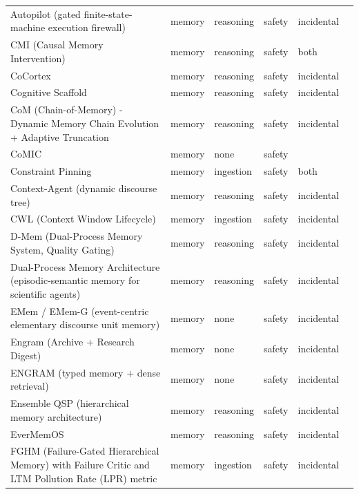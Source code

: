 \begin{longtable}{@{}>{\raggedright\arraybackslash}p{}lllll@{}}
Autopilot (gated finite-state-machine execution firewall) & memory & reasoning & safety & incidental & \cite{deng-2026-goalautopilot} \\
CMI (Causal Memory Intervention) & memory & reasoning & safety & both & \cite{srivastava-2026-causal} \\
CoCortex & memory & reasoning & safety & incidental & \cite{kaviyaraj-2026-cocortex} \\
Cognitive Scaffold & memory & reasoning & safety & incidental & \cite{ai-2026-cognitive} \\
CoM (Chain-of-Memory) - Dynamic Memory Chain Evolution + Adaptive Truncation & memory & reasoning & safety & incidental & \cite{xu-2026-chainofmemory} \\
CoMIC & memory & none & safety &  & \cite{wang-2026-comic} \\
Constraint Pinning & memory & ingestion & safety & both & \cite{chen-2026-governance} \\
Context-Agent (dynamic discourse tree) & memory & reasoning & safety & incidental & \cite{hu-2026-contextagent} \\
CWL (Context Window Lifecycle) & memory & ingestion & safety & incidental & \cite{semenov-2026-compaction} \\
D-Mem (Dual-Process Memory System, Quality Gating) & memory & reasoning & safety & incidental & \cite{you-2026-dmem} \\
Dual-Process Memory Architecture (episodic-semantic memory for scientific agents) & memory & reasoning & safety & incidental & \cite{milosevic-2026-episodicsemantic} \\
EMem / EMem-G (event-centric elementary discourse unit memory) & memory & none & safety & incidental & \cite{zhou-2025-simple} \\
Engram (Archive + Research Digest) & memory & none & safety & incidental & \cite{karimi-2026-improving} \\
ENGRAM (typed memory + dense retrieval) & memory & none & safety & incidental & \cite{patel-2025-engram} \\
Ensemble QSP (hierarchical memory architecture) & memory & reasoning & safety & incidental & \cite{tewari-2026-hierarchical} \\
EverMemOS & memory & reasoning & safety & incidental & \cite{hu-2026-evermemos} \\
FGHM (Failure-Gated Hierarchical Memory) with Failure Critic and LTM Pollution Rate (LPR) metric & memory & ingestion & safety & incidental & \cite{liu-2026-failuregated} \\

\end{longtable}
